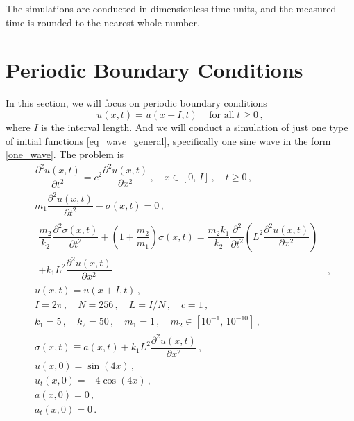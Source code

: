 \documentclass[11pt,a4paper,oneside,openright]{report} %
\begin{document}
The simulations are conducted in dimensionless time units, and the measured time is rounded to the nearest whole number.



\section{Periodic Boundary Conditions}
\noindent
In this section, we will focus on periodic boundary conditions
\begin{equation}
    u(x, t) = u(x + I, t) \,  \quad \text{for all} \; t \geq 0 \, ,
\end{equation}
where $I$ is the interval length. And we will conduct a simulation of just one type of initial functions \eqref{eq_wave_general}, specifically one sine wave in the form \eqref{one_wave}. The problem is
\begin{subequations}\label{}
    \begin{align}
        & \dfrac{\partial^2 u (x, t)}{\partial t^2 } = c^2 \dfrac{\partial^2 u (x, t)}{\partial x^2} \, , \quad x \in [0, \, I] \, , \quad t \geq 0 \, , \label{eq_mix_one_periodic_1} \\[5pt]
        & m_1 \dfrac{\partial^2 u(x,t)}{\partial t^2} - \sigma(x,t)  = 0 \, , \label{eq_mix_one_periodic_2} \\[5pt]
        & \begin{aligned}
            \dfrac{m_2}{k_2} \dfrac{\partial^2 \sigma(x,t)}{\partial t^2}  + \left(1 + \dfrac{m_2}{m_1} \right) \sigma(x,t) = \dfrac{m_2 k_1}{k_2} \dfrac{\partial^2 }{\partial t^2 } \left(L^2 \dfrac{\partial^2 u(x,t)}{\partial x^2} \right) & \\ + k_1 L^2 \dfrac{\partial^2 u(x,t)}{\partial x^2} & \, ,
        \end{aligned}\label{eq_mix_one_periodic_3} \\[5pt]
        & u(x, t) = u(x + I, t) \, , \label{eq_mix_one_periodic_4} \\[5pt]
        & I = 2\pi \, , \quad N = 256 \, , \quad L = I/N \, , \quad c = 1 \, , \label{eq_mix_one_periodic_5} \\[5pt]
        & k_1 = 5 \, , \quad k_2 = 50 \, , \quad m_1 = 1 \, , \quad m_2 \in [10^{-1}, \, 10^{-10}] \, , \label{eq_mix_one_periodic_6} \\[5pt]
        & \sigma(x,t) \equiv a(x,t) + k_1 L^2 \dfrac{\partial^2 u(x,t)}{\partial x^2} \, , \label{eq_mix_one_periodic_7} \\[5pt]
        & u(x,0) = \sin{(4 x)} \, , \label{eq_mix_one_periodic_8} \\[5pt]
        & u_t(x,0) =  - 4 \cos{(4x)} \, , \label{eq_mix_one_periodic_9} \\[5pt]
        & a(x,0) = 0 \, , \label{eq_mix_one_periodic_10} \\[5pt]
        & a_t(x,0) = 0 \, . \label{eq_mix_one_periodic_11}
    \end{align}
\end{subequations}
\end{document}
